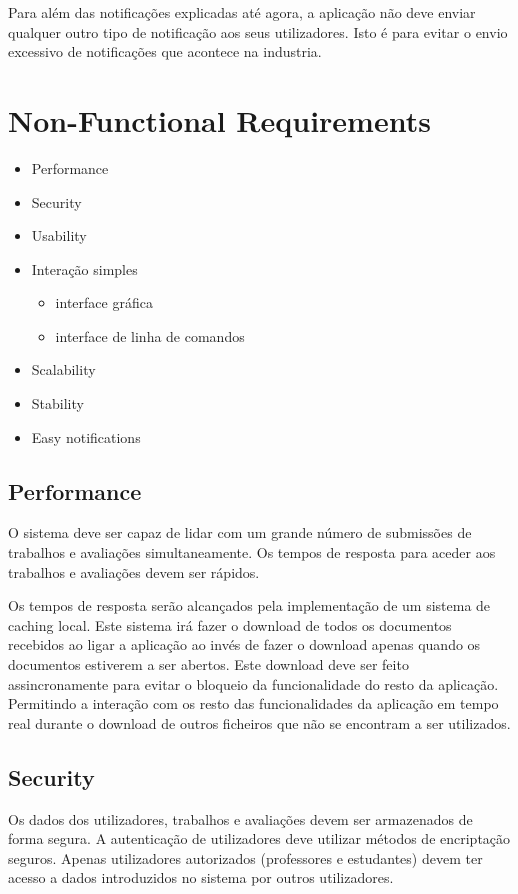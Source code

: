 \documentclass[10pt]{article}
\begin{document}
Para além das notificações explicadas até agora, a aplicação não deve enviar qualquer outro tipo de notificação
aos seus utilizadores. Isto é para evitar o envio excessivo de notificações que acontece na industria.

\newpage

\section{Non-Functional Requirements}

\begin{itemize}
    \item Performance
    \item Security
    \item Usability
    \item Interação simples
        \begin{itemize}
            \item interface gráfica
            \item interface de linha de comandos
        \end{itemize}
    \item Scalability
    \item Stability
    \item Easy notifications
\end{itemize}

\subsection{Performance}
O sistema deve ser capaz de lidar com um grande número de submissões de trabalhos e avaliações simultaneamente. 
Os tempos de resposta para aceder aos trabalhos e avaliações devem ser rápidos.

Os tempos de resposta serão alcançados pela implementação de um sistema de caching local.
Este sistema irá fazer o download de todos os documentos recebidos ao ligar a aplicação ao invés
de fazer o download apenas quando os documentos estiverem a ser abertos. Este download deve ser
feito assincronamente para evitar o bloqueio da funcionalidade do resto da aplicação. Permitindo
a interação com os resto das funcionalidades da aplicação em tempo real durante o download de outros
ficheiros que não  se encontram a ser utilizados.

\subsection{Security}
Os dados dos utilizadores, trabalhos e avaliações devem ser armazenados de forma segura. 
A autenticação de utilizadores deve utilizar métodos de encriptação seguros. 
Apenas utilizadores autorizados (professores e estudantes) devem ter acesso a dados introduzidos no sistema por outros 
utilizadores.
\end{document}
